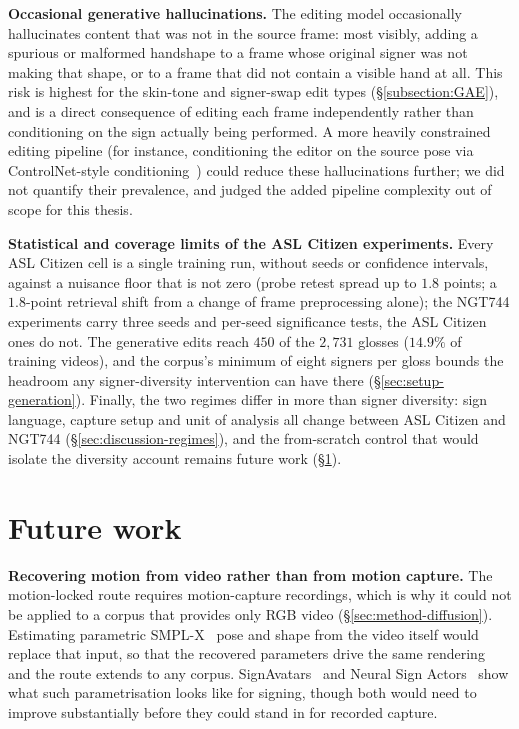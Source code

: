 \textbf{Occasional generative hallucinations.} The editing model
occasionally hallucinates content that was not in the source frame:
most visibly, adding a spurious or malformed handshape to a frame whose
original signer was not making that shape, or to a frame that did not
contain a visible hand at all. This risk is highest for the skin-tone and
signer-swap edit types (\S\ref{subsection:GAE}), and is a direct
consequence of editing each frame independently rather than conditioning
on the sign actually being performed.
 A more heavily
constrained editing pipeline (for instance, conditioning the editor
on the source pose via ControlNet-style
conditioning~\cite{zhangAddingConditionalControl2023}) could reduce these hallucinations
further; we did not quantify their prevalence, and judged the added
pipeline complexity out of scope for this thesis.

\textbf{Statistical and coverage limits of the ASL Citizen experiments.}
Every ASL Citizen cell is a single training run, without seeds or
confidence intervals, against a nuisance floor that is not zero (probe
retest spread up to $1.8$ points; a $1.8$-point retrieval shift from a
change of frame preprocessing alone); the NGT744 experiments carry three
seeds and per-seed significance tests, the ASL Citizen ones do not. The
generative edits reach $450$ of the $2{,}731$ glosses ($14.9\%$ of
training videos), and the corpus's minimum of eight signers per gloss
bounds the headroom any signer-diversity intervention can have there
(\S\ref{sec:setup-generation}). Finally, the two regimes differ in more
than signer diversity: sign language, capture setup and unit of analysis
all change between ASL Citizen and NGT744
(\S\ref{sec:discussion-regimes}), and the from-scratch control that
would isolate the diversity account remains future work
(\S\ref{sec:future-work}).

\section{Future work}
\label{sec:future-work}
\textbf{Recovering motion from video rather than from motion capture.}
The motion-locked route requires motion-capture recordings, which is why
it could not be applied to a corpus that provides only RGB video
(\S\ref{sec:method-diffusion}). Estimating parametric
SMPL-X~\cite{pavlakosExpressiveBodyCapture2019a} pose and shape from the
video itself would replace that input, so that the recovered parameters
drive the same rendering and the route extends to any corpus.
SignAvatars~\cite{yuSignAvatarsLargeScale3D2025} and Neural Sign
Actors~\cite{baltatzisNeuralSignActors2024a} show what such
parametrisation looks like for signing, though both would need to improve
substantially before they could stand in for recorded capture.

